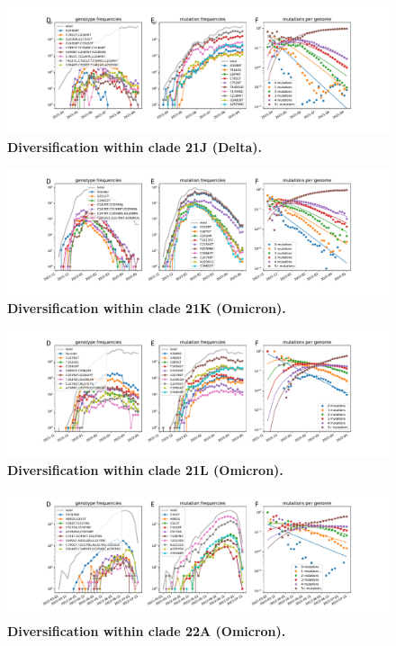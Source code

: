\begin{figure}[h]
    \includegraphics[width=\textwidth]{figures/counts/21J_counts.pdf}
    \caption{{\bf Diversification within clade 21J (Delta).}
    \label{fig:21J_counts}}
\end{figure}

\begin{figure}[h]
    \includegraphics[width=\textwidth]{figures/counts/21K_counts.pdf}
    \caption{{\bf Diversification within clade 21K (Omicron).}
    \label{fig:21K_counts}}
\end{figure}

\begin{figure}[h]
    \includegraphics[width=\textwidth]{figures/counts/21L_counts.pdf}
    \caption{{\bf Diversification within clade 21L (Omicron).}
    \label{fig:21L_counts}}
\end{figure}

\begin{figure}[h]
    \includegraphics[width=\textwidth]{figures/counts/22A_counts.pdf}
    \caption{{\bf Diversification within clade 22A (Omicron).}
    \label{fig:22A_counts}}
\end{figure}

